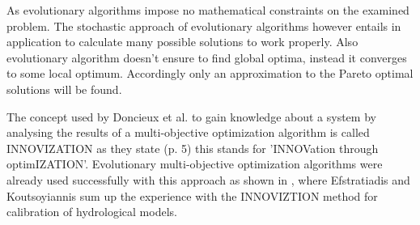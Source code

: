 \documentclass[12pt,twoside]{article}
\theoremstyle{plain}
\theoremstyle{definition}
\theoremstyle{remark}
\begin{document}
As evolutionary algorithms impose no mathematical constraints on the examined problem. The stochastic approach of evolutionary algorithms however entails in application to calculate many possible solutions to work properly. Also evolutionary algorithm doesn't ensure to find global optima, instead it converges to some local optimum. Accordingly only an approximation to the Pareto optimal solutions will be found.

The concept used by Doncieux et al. to gain knowledge about a system by analysing the results of a multi-objective optimization algorithm is called INNOVIZATION as they state \cite{doncieux2015multi} (p. 5) this stands for 'INNOVation through optimIZATION'.
Evolutionary multi-objective optimization algorithms were already used successfully with this approach as shown in \cite{efstratiadis2010one}, where Efstratiadis and Koutsoyiannis sum up the experience with the INNOVIZTION method for calibration of hydrological models.
\end{document}
